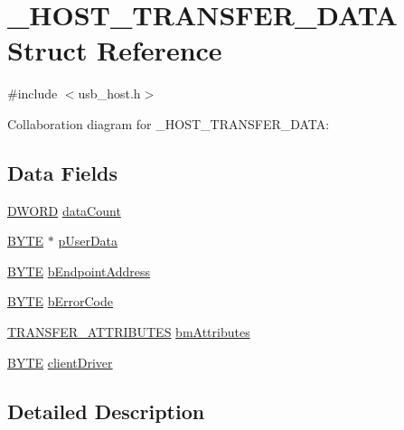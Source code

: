 \hypertarget{struct___h_o_s_t___t_r_a_n_s_f_e_r___d_a_t_a}{}\section{\+\_\+\+H\+O\+S\+T\+\_\+\+T\+R\+A\+N\+S\+F\+E\+R\+\_\+\+D\+A\+T\+A Struct Reference}
\label{struct___h_o_s_t___t_r_a_n_s_f_e_r___d_a_t_a}


{\ttfamily \#include $<$usb\+\_\+host.\+h$>$}



Collaboration diagram for \+\_\+\+H\+O\+S\+T\+\_\+\+T\+R\+A\+N\+S\+F\+E\+R\+\_\+\+D\+A\+T\+A\+:
\subsection*{Data Fields}
\begin{DoxyCompactItemize}
\item 
\hyperlink{_generic_type_defs_8h_ad342ac907eb044443153a22f964bf0af}{D\+W\+O\+R\+D} \hyperlink{struct___h_o_s_t___t_r_a_n_s_f_e_r___d_a_t_a_ae06ef282125e03d753ff6ad3acff2241}{data\+Count}
\item 
\hyperlink{_generic_type_defs_8h_a4ae1dab0fb4b072a66584546209e7d58}{B\+Y\+T\+E} $\ast$ \hyperlink{struct___h_o_s_t___t_r_a_n_s_f_e_r___d_a_t_a_a219c2ba5becd0223be022280b5a98efe}{p\+User\+Data}
\item 
\hyperlink{_generic_type_defs_8h_a4ae1dab0fb4b072a66584546209e7d58}{B\+Y\+T\+E} \hyperlink{struct___h_o_s_t___t_r_a_n_s_f_e_r___d_a_t_a_a80a1ec4bf8007a3ee5ff04c08d6f985d}{b\+Endpoint\+Address}
\item 
\hyperlink{_generic_type_defs_8h_a4ae1dab0fb4b072a66584546209e7d58}{B\+Y\+T\+E} \hyperlink{struct___h_o_s_t___t_r_a_n_s_f_e_r___d_a_t_a_aba3e0f90a1105d1fb6a5ba7a769cf368}{b\+Error\+Code}
\item 
\hyperlink{union_t_r_a_n_s_f_e_r___a_t_t_r_i_b_u_t_e_s}{T\+R\+A\+N\+S\+F\+E\+R\+\_\+\+A\+T\+T\+R\+I\+B\+U\+T\+E\+S} \hyperlink{struct___h_o_s_t___t_r_a_n_s_f_e_r___d_a_t_a_a7f8f2a62d332545d70f7c784e4e6e620}{bm\+Attributes}
\item 
\hyperlink{_generic_type_defs_8h_a4ae1dab0fb4b072a66584546209e7d58}{B\+Y\+T\+E} \hyperlink{struct___h_o_s_t___t_r_a_n_s_f_e_r___d_a_t_a_a4ee215657b94c3ce8c340d29a1c551e3}{client\+Driver}
\end{DoxyCompactItemize}


\subsection{Detailed Description}


